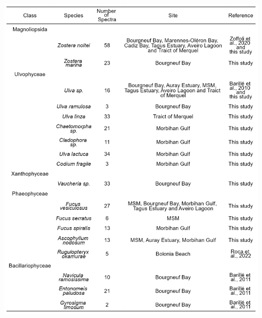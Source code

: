 \documentclass[
  letterpaper,
  11pt,
  english,
  singlespacing,
  headsepline]{MastersDoctoralThesis}
\begin{document}
\begin{spacing}{1.5}
\begin{table}
{\includegraphics[width=0.95\linewidth,height=\textheight,keepaspectratio]{Chapter2/Figs/SPECIESTABLE.png}

}

\end{table}%

\begin{figure}

\end{figure}
\end{spacing}
\end{document}
